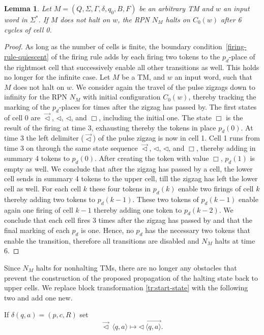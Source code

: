 \documentclass[pre,amssymb,showpacs,showkeys,preprint]{revtex4}
\newtheorem{lemma}{Lemma}
\begin{document}
\begin{lemma}
\label{lemma:apn-halting}
Let $M = (Q, \Sigma, \Gamma, \delta, q_0, B, F)$ be an arbitrary TM and $w$ an input word in $\Sigma^*$.
If $M$ does not halt on $w$, the RPN $N_M$ halts on $C_0(w)$ after 6 cycles of cell 0.
\end{lemma}
\begin{proof}
As long as the number of cells is finite, the boundary condition~\ref{firing-rule-quiescent} of the firing rule adds by each firing
two tokens to the $p_d$-place of the rightmost cell that successively enable all other transitions as well.
This holds no longer for the infinite case.
Let $M$ be a TM, and $w$ an input word, such that $M$ does not halt on $w$.
We consider again the travel of the pulse zigzags down to infinity for the RPN $N_M$ with
initial configuration $C_0(w)$, thereby tracking the marking of the $p_d$-places
for times after the zigzag has passed by.
The first states of cell $0$ are $\overrightarrow{\lhd}$, $\lhd$, $\lhd$, and $\Box$, including the initial one.
The state $\Box$ is the result of the firing at time 3, exhausting thereby the tokens in place $p_d(0)$.
At time 3 the left delimiter ($\overrightarrow{\lhd}$) of the pulse zigzag is now in cell 1.
Cell 1 runs from time 3 on through the same state sequence $\overrightarrow{\lhd}$, $\lhd$, $\lhd$, and $\Box$,
thereby adding in summary 4 tokens to $p_d(0)$.
After creating the token with value $\Box$, $p_d(1)$ is empty as well.
We conclude that after the zigzag has passed by a cell, the lower cell sends in summary 4 tokens to the upper cell,
till the zigzag has left the lower cell as well.
For each cell $k$ these four tokens in $p_d(k)$ enable two firings of cell $k$ thereby adding two tokens
to $p_d(k-1)$.
These two tokens of $p_d(k-1)$ enable again one firing of cell $k-1$ thereby adding one token to $p_d(k-2)$.
We conclude that each cell fires 3 times after the zigzag has passed by and that the final marking of each $p_d$ is one.
Hence, no $p_d$ has the necessary two tokens that enable the transition, therefore all transitions are disabled
and $N_M$ halts at time 6.
\end{proof}

Since $N_M$ halts for nonhalting TMs, there are no longer any obstacles that prevent
the construction of the proposed propagation of the halting state back to upper cells.
We replace block transformation \ref{tr:start-state} with the following two and add one new.

If $\delta(q,a) = (p,c,R)$ set
\begin{equation}
\overrightarrow{\lhd} \: \langle q, a \rangle \mapsto \lhd \:
\overrightarrow{\langle q, a \rangle}.
\label{tr:start-state2}
\end{equation}
\end{document}
